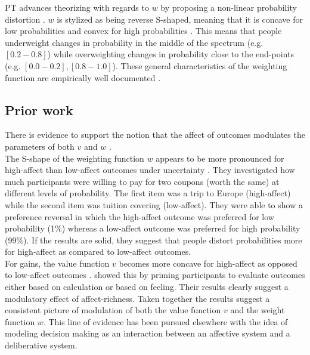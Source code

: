 \documentclass[12pt]{article}
\begin{document}
PT advances theorizing with regards to $w$
by proposing a non-linear probability
distortion \autocite{PT}. $w$ is stylized as
being reverse S-shaped, meaning that it is
concave for low probabilities and convex for
high probabilities \autocite{gonzalez1999shape}.
This means that
people underweight changes in probability in
the middle of the spectrum (e.g. $[0.2-0.8]$)
while overweighting changes in probability close
to the end-points (e.g. $[0.0 - 0.2], [0.8 - 1.0]$).
These general characteristics of the weighting
function are empirically well documented
\autocite{tversky1992advances,
wu1996curvature}.

\subsection{Prior work}

There is evidence to support
the notion that the affect of outcomes modulates
the parameters of both $v$
\autocite{hsee2004music} and $w$ \autocite{
rottenstreich2001money}. \\

The S-shape of the weighting function
$w$ appears to be more pronounced
for high-affect than low-affect outcomes under
uncertainty \autocite{rottenstreich2001money}.
They investigated how much participants were
willing to pay for two coupons
(worth the same) at different
levels of probability. The first item was
a trip to Europe (high-affect) while the second
item was tuition covering (low-affect). They
were able to show a preference reversal in
which the high-affect outcome was preferred for
low probability (1\%) whereas a low-affect
outcome was preferred for high probability (99\%).
If the results are solid, they suggest
that people distort probabilities
more for high-affect as compared to low-affect
outcomes. \\

For gains, the value function $v$ becomes more
concave for high-affect as opposed to low-affect
outcomes \autocite{hsee2004music}.
\textcite{hsee2004music} showed this by
priming participants to
evaluate outcomes either based on calculation or
based on feeling. Their results clearly suggest
a modulatory effect of affect-richness. Taken
together the results suggest a consistent picture
of modulation of both the value function $v$ and
the weight function  $w$. This line of evidence
has been pursued elsewhere \autocite{
	mukherjee2010dual,
mukherjee2011thinking} with the idea of modeling
decision making as an interaction between an
affective system and a deliberative system.
\end{document}
